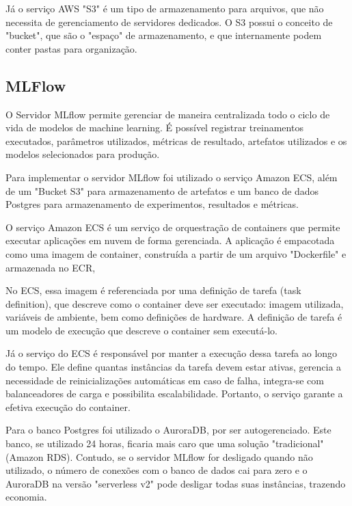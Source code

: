 Já o serviço \acrshort{AWS} "\acrshort{S3}" é um tipo de armazenamento para arquivos, que não necessita de gerenciamento de servidores dedicados. O \acrshort{S3} possui o conceito de "bucket", que são o "espaço" de armazenamento, e que internamente podem conter pastas para organização.  

\subsection{MLFlow}

O Servidor \acrfull{MLflow} permite gerenciar de maneira centralizada todo o ciclo de vida de modelos de machine learning. É possível registrar treinamentos executados, parâmetros utilizados, métricas de resultado, artefatos utilizados e os modelos selecionados para produção.  

Para implementar o servidor \acrshort{MLflow} foi utilizado o serviço Amazon \acrfull{ECS}, além de um "Bucket \acrshort{S3}" para armazenamento de artefatos e um banco de dados Postgres para armazenamento de experimentos, resultados e métricas. 

O serviço Amazon \acrshort{ECS} é um serviço de orquestração de containers que permite executar aplicações em nuvem de forma gerenciada. A aplicação é empacotada como uma imagem de container, construída a partir de um arquivo "Dockerfile" e armazenada no \acrfull{ECR},  

No \acrshort{ECS}, essa imagem é referenciada por uma definição de tarefa (task definition), que descreve como o container deve ser executado: imagem utilizada, variáveis de ambiente, bem como definições de hardware. A definição de tarefa é um modelo de execução que descreve o container sem executá-lo. 

Já o serviço do \acrshort{ECS} é responsável por manter a execução dessa tarefa ao longo do tempo. Ele define quantas instâncias da tarefa devem estar ativas, gerencia a necessidade de reinicializações automáticas em caso de falha, integra-se com balanceadores de carga e possibilita escalabilidade. Portanto, o serviço garante a efetiva execução do container. 

Para o banco Postgres foi utilizado o AuroraDB, por ser autogerenciado. Este banco, se utilizado 24 horas, ficaria mais caro que uma solução "tradicional" (Amazon \acrfull{RDS}). Contudo, se o servidor \acrshort{MLflow} for desligado quando não utilizado, o número de conexões com o banco de dados cai para zero e o AuroraDB na versão "serverless v2" pode desligar todas suas instâncias, trazendo economia. 

